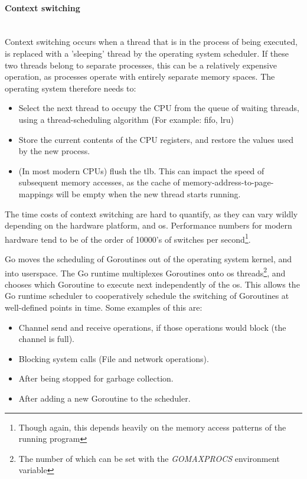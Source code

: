 \paragraph{Context switching} \mbox{}\\

Context switching occurs when a thread that is in the process of being executed,
is replaced with a 'sleeping' thread by the operating system scheduler. If
these two threads belong to separate processes, this can be a relatively
expensive operation, as processes operate with entirely separate memory spaces.
The operating system therefore needs to:
\begin{itemize}
  \item Select the next thread to occupy the CPU from the queue of waiting
  threads, using a thread-scheduling algorithm (For example: \gls{fifo},
  \gls{lru})
  \item Store the current contents of the CPU registers, and restore the values
  used by the new process.
  \item (In most modern CPUs) flush the \gls{tlb}\cite{taggedTLB}. This can
  impact the speed of subsequent memory accesses, as the cache of
  memory-address-to-page-mappings will be empty when the new thread starts
  running.
\end{itemize}

The time costs of context switching are hard to quantify, as they can vary
wildly depending on the hardware platform, and \gls{os}. Performance
numbers for modern hardware tend to be of the order of 10000's of switches per
second\footnote{Though again, this depends heavily on the memory access patterns
of the running program}.

Go moves the scheduling of Goroutines out of the operating system kernel, and
into userspace. The Go runtime multiplexes Goroutines onto \gls{os}
threads\footnote{The number of which can be set with the \textit{GOMAXPROCS}
environment variable}, and chooses which Goroutine to execute next independently
of the \gls{os}. This allows the Go runtime scheduler to cooperatively schedule
the switching of Goroutines at well-defined points in time. Some examples of
this are\cite{performanceWithoutTheEventLoop}:

\begin{itemize}
  \item Channel send and receive operations, if those operations would block (the channel is full).
  \item Blocking system calls (File and network operations).
  \item After being stopped for garbage collection.
  \item After adding a new Goroutine to the scheduler.
\end{itemize}

